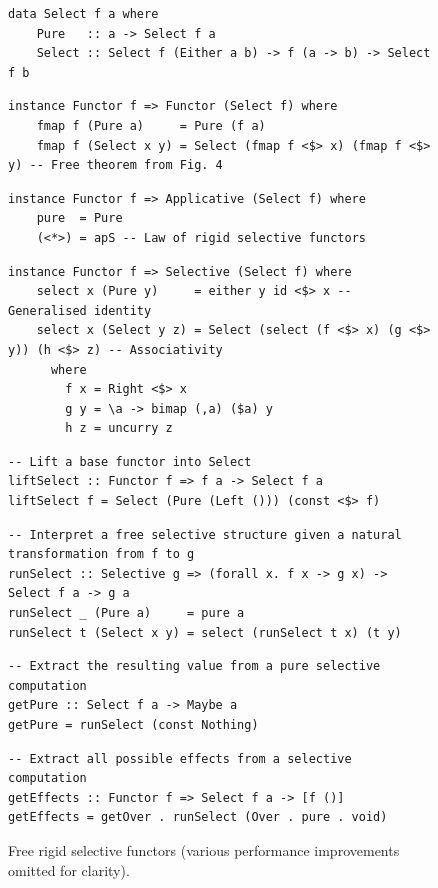 \begin{figure}
\begin{verbatim}
data Select f a where
    Pure   :: a -> Select f a
    Select :: Select f (Either a b) -> f (a -> b) -> Select f b
\end{verbatim}
\vspace{0mm}
\begin{verbatim}
instance Functor f => Functor (Select f) where
    fmap f (Pure a)     = Pure (f a)
    fmap f (Select x y) = Select (fmap f <$> x) (fmap f <$> y) -- Free theorem from Fig. 4
\end{verbatim}
\vspace{0mm}
\begin{verbatim}
instance Functor f => Applicative (Select f) where
    pure  = Pure
    (<*>) = apS -- Law of rigid selective functors
\end{verbatim}
\vspace{0mm}
\begin{verbatim}
instance Functor f => Selective (Select f) where
    select x (Pure y)     = either y id <$> x -- Generalised identity
    select x (Select y z) = Select (select (f <$> x) (g <$> y)) (h <$> z) -- Associativity
      where
        f x = Right <$> x
        g y = \a -> bimap (,a) ($a) y
        h z = uncurry z
\end{verbatim}
\vspace{0mm}
\begin{verbatim}
-- Lift a base functor into Select
liftSelect :: Functor f => f a -> Select f a
liftSelect f = Select (Pure (Left ())) (const <$> f)
\end{verbatim}
\vspace{0mm}
\begin{verbatim}
-- Interpret a free selective structure given a natural transformation from f to g
runSelect :: Selective g => (forall x. f x -> g x) -> Select f a -> g a
runSelect _ (Pure a)     = pure a
runSelect t (Select x y) = select (runSelect t x) (t y)
\end{verbatim}
\vspace{0mm}
\begin{verbatim}
-- Extract the resulting value from a pure selective computation
getPure :: Select f a -> Maybe a
getPure = runSelect (const Nothing)
\end{verbatim}
\vspace{0mm}
\begin{verbatim}
-- Extract all possible effects from a selective computation
getEffects :: Functor f => Select f a -> [f ()]
getEffects = getOver . runSelect (Over . pure . void)
\end{verbatim}
\vspace{-3mm}
\caption{Free rigid selective functors (various performance improvements
omitted for clarity).}\label{fig-free}
\vspace{-4mm}
\end{figure}

